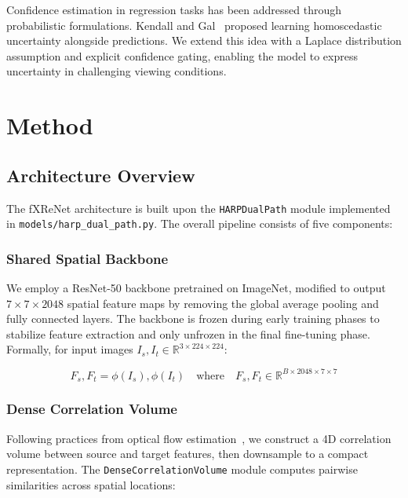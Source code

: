 \documentclass[sigconf,nonacm]{acmart}
\begin{document}
Confidence estimation in regression tasks has been addressed through probabilistic formulations. Kendall and Gal~\cite{kendall2017uncertainties} proposed learning homoscedastic uncertainty alongside predictions. We extend this idea with a Laplace distribution assumption and explicit confidence gating, enabling the model to express uncertainty in challenging viewing conditions.

\section{Method}

\subsection{Architecture Overview}

The fXReNet architecture is built upon the \texttt{HARPDualPath} module implemented in \texttt{models/harp\_dual\_path.py}. The overall pipeline consists of five components:

\subsubsection{Shared Spatial Backbone}

We employ a ResNet-50 backbone pretrained on ImageNet, modified to output $7 \times 7 \times 2048$ spatial feature maps by removing the global average pooling and fully connected layers. The backbone is frozen during early training phases to stabilize feature extraction and only unfrozen in the final fine-tuning phase. Formally, for input images $I_s, I_t \in \mathbb{R}^{3 \times 224 \times 224}$:

\begin{equation}
F_s, F_t = \phi(I_s), \phi(I_t) \quad \text{where} \quad F_s, F_t \in \mathbb{R}^{B \times 2048 \times 7 \times 7}
\end{equation}

\subsubsection{Dense Correlation Volume}

Following practices from optical flow estimation~\cite{raft}, we construct a 4D correlation volume between source and target features, then downsample to a compact representation. The \texttt{DenseCorrelationVolume} module computes pairwise similarities across spatial locations:
\end{document}
